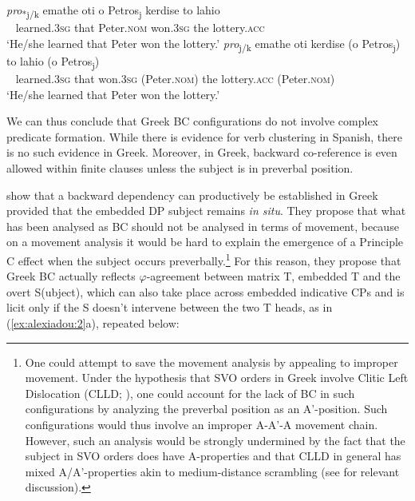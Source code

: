 \documentclass[output=paper]{langsci/langscibook}
\begin{document}
\ea%
    \label{ex:alexiadou:25}
    \ea\label{ex:alexiadou:25a}
    \gll \textit{pro}\textsubscript{*j/k}  emathe   oti   {o Petros\textsubscript{j}}   kerdise   to lahio \\
         ~ learned{}.\textsc{3sg}   that Peter{}.\textsc{nom}   won{}.\textsc{3sg} the lottery{}.\textsc{acc} \\
    \glt ‘He/she learned that Peter won the lottery.’
    \ex\label{ex:alexiadou:25b}
        \gll \textit{pro}\textsubscript{j/k}  emathe   oti   kerdise ({o Petros\textsubscript{j}}) to lahio ({o Petros\textsubscript{j}})          \\
        ~     learned{}.\textsc{3sg}    that     won{}.\textsc{3sg} (Peter{}.\textsc{nom}) the lottery{}.\textsc{acc}  (Peter{}.\textsc{nom})        \\
        \glt ‘He/she learned that Peter won the lottery.’
    \z
\z

We can thus conclude that Greek BC configurations do not involve complex predicate formation. While there is evidence for verb clustering in Spanish, there is no such evidence in Greek. Moreover, in Greek, backward co-reference is even allowed within finite clauses unless the subject is in preverbal position.

\citet{Tsakali2017} show that a backward dependency can productively be established in Greek provided that the embedded DP subject remains \textit{in situ}. They propose that what has been analysed as BC should not be analysed in terms of movement, because on a movement analysis it would be hard to explain the emergence of a Principle C effect when the subject occurs preverbally.\footnote{One could attempt to save the movement analysis by appealing to improper movement. Under the hypothesis that SVO orders in Greek involve Clitic Left Dislocation (CLLD; \citealt{Alexiadou1998}), one could account for the lack of BC in such configurations by analyzing the preverbal position as an A’-position. Such configurations would thus involve an improper A-A’-A movement chain. However, such an analysis would be strongly undermined by the fact that the subject in SVO orders does have A-properties and that CLLD in general has mixed A\slash A’-properties akin to medium-distance scrambling (see \citealt{Miyagawa2017} for relevant discussion).}  For this reason, they propose that Greek BC actually reflects $\varphi ${}-agreement between matrix T, embedded T and the overt S(ubject), which can also take place across embedded indicative CPs and is licit only if the S doesn’t intervene between the two T heads, as in (\ref{ex:alexiadou:2}a), repeated below:
\end{document}
